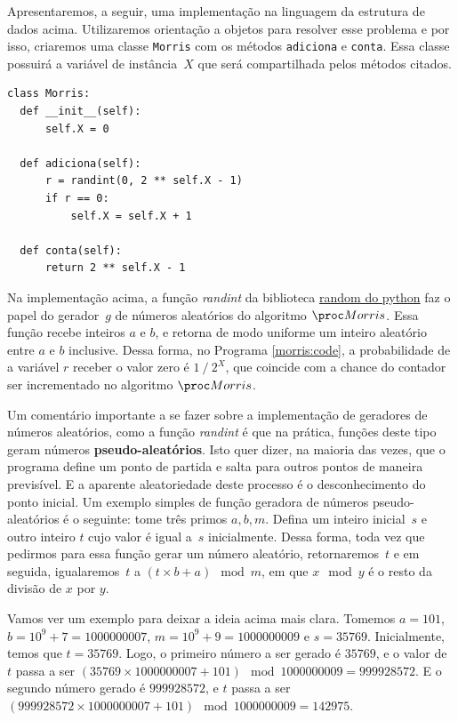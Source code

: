 Apresentaremos, a seguir, uma implementação na linguagem  da estrutura de dados acima. Utilizaremos 
orientação a objetos para resolver esse problema e por isso, criaremos uma classe \texttt{Morris} com os métodos 
\texttt{adiciona} e \texttt{conta}. Essa classe possuirá a variável de instância~$X$ que será compartilhada pelos 
métodos citados.

\begin{lstlisting}[style=mypython,caption=Implementação do algoritmo $\Morris$,captionpos=b, label=morris:code]
class Morris:
  def __init__(self):
      self.X = 0

  def adiciona(self):
      r = randint(0, 2 ** self.X - 1)
      if r == 0:
          self.X = self.X + 1

  def conta(self):
      return 2 ** self.X - 1
\end{lstlisting}

Na implementação acima, a função \textit{randint} da biblioteca \hyperref[PythonRandom]{random do python} faz o papel do 
gerador~$g$ de números aleatórios do algoritmo $\Morris$. Essa função recebe inteiros $a$ e $b$, e retorna de modo 
uniforme um inteiro aleatório entre $a$ e $b$ inclusive. Dessa forma, no Programa \ref{morris:code}, a probabilidade de 
a variável $r$ receber o valor zero é $1 \mathbin{/} 2^{X}$, que coincide com a chance do contador ser incrementado no 
algoritmo $\Morris$.

Um comentário importante a se fazer sobre a implementação de geradores de números aleatórios, como a função 
\textit{randint} é que na prática, funções deste tipo geram números \textbf{pseudo-aleatórios}. Isto quer dizer, na 
maioria das vezes, que o programa define um ponto de partida e salta para outros pontos de maneira previsível. E a 
aparente aleatoriedade deste processo é o desconhecimento do ponto inicial. Um exemplo simples de função geradora de 
números pseudo-aleatórios é o seguinte: tome três primos $a, b, m$. Defina um inteiro inicial~$s$ e outro inteiro $t$ 
cujo valor é igual a~$s$ inicialmente. Dessa forma, toda vez que pedirmos para essa função gerar um número aleatório, 
retornaremos~$t$ e em seguida, igualaremos~$t$ a $(t \times b + a) \mod m$, em que $x \mod y$ é o resto da divisão de 
$x$ por $y$.

Vamos ver um exemplo para deixar a ideia acima mais clara. Tomemos $a = 101$, $b = 10^9 + 7 = 1000000007$, 
$m = 10^9 + 9 = 1000000009$ e $s = 35769$. Inicialmente, temos que $t = 35769$. Logo, o primeiro número a ser gerado é
$35769$, e o valor de $t$ passa a ser $(35769 \times 1000000007 + 101) \mod 1000000009 = 999928572$. E o segundo número
gerado é $999928572$, e $t$ passa a ser $(999928572 \times 1000000007 + 101) \mod 1000000009 = 142975$.

